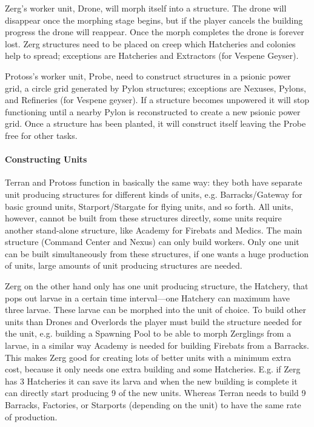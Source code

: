 Zerg’s worker unit, Drone, will morph itself into a structure. The drone will disappear once the
morphing stage begins, but if the player cancels the building progress the drone will reappear. Once
the morph completes the drone is forever lost. Zerg structures need to be placed on creep which
Hatcheries and colonies help to spread; exceptions are Hatcheries and Extractors (for Vespene
Geyser).

Protoss’s worker unit, Probe, need to construct structures in a psionic power grid, a circle grid
generated by Pylon structures; exceptions are Nexuses, Pylons, and Refineries (for Vespene geyser).
If a structure becomes unpowered it will stop functioning until a nearby Pylon is reconstructed to
create a new psionic power grid. Once a structure has been planted, it will construct itself leaving
the Probe free for other tasks.

\paragraph{Constructing Units}
Terran and Protoss function in basically the same way: they both have separate unit producing
structures for different kinds of units, e.g. Barracks/Gateway for basic ground units,
Starport/Stargate for flying units, and so forth. All units, however, cannot be built from these
structures directly, some units require another stand-alone structure, like Academy for Firebats and
Medics. The main structure (Command Center and Nexus) can only build workers. Only one unit can be
built simultaneously from these structures, if one wants a huge production of units, large amounts
of unit producing structures are needed.

Zerg on the other hand only has one unit producing structure, the Hatchery, that pops out larvae in
a certain time interval—one Hatchery can maximum have three larvae. These larvae can be morphed into
the unit of choice. To build other units than Drones and Overlords the player must build the
structure needed for the unit, e.g. building a Spawning Pool to be able to morph Zerglings from a
larvae, in a similar way Academy is needed for building Firebats from a Barracks. This makes Zerg
good for creating lots of better units with a minimum extra cost, because it only needs one extra
building and some Hatcheries. E.g. if Zerg has 3 Hatcheries it can save its larva and when the new
building is complete it can directly start producing 9 of the new units. Whereas Terran needs to
build 9 Barracks, Factories, or Starports (depending on the unit) to have the same rate of
production.

